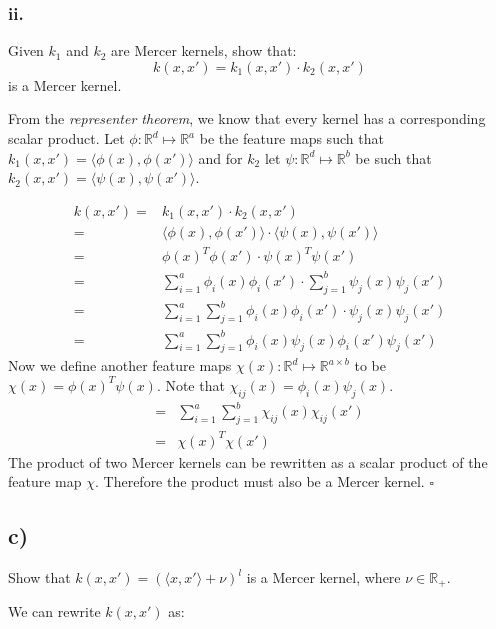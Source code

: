 \documentclass{article}
\newcommand{\R}[0]{\mathbb{R}}
\begin{document}
\subsubsection*{ii.}

Given $k_1$ and $k_2$ are Mercer kernels, show that:
\begin{equation}
    k(x, x') = k_1(x, x') \cdot k_2(x, x')
\end{equation}
is a Mercer kernel.


From the \emph{representer theorem}, we know that every kernel has a corresponding
scalar product.
Let $\phi : \R^d \mapsto \R^a $ be the feature maps such that $k_1(x, x') = \langle{}\phi(x),\phi(x')\rangle{}$ and
for $k_2$ let  $\psi : \R^d \mapsto \R^b$ be such that $k_2(x, x') = \langle{}\psi(x),\psi(x')\rangle{}$.

\begin{align}
    k(x, x') = &k_1(x, x') \cdot k_2(x, x')\\
    = & \langle{}\phi(x), \phi(x')\rangle{} \cdot \langle{}\psi(x), \psi(x')\rangle{}\\
    = & \phi(x)^T \phi(x') \cdot \psi(x)^T \psi(x')\\
    = & \sum_{i=1}^a \phi_i(x) \phi_i(x') \cdot \sum_{j=1}^b \psi_j(x) \psi_j(x')\\
    = & \sum_{i=1}^a \sum_{j=1}^b \phi_i(x) \phi_i(x') \cdot  \psi_j(x) \psi_j(x')\\
    = & \sum_{i=1}^a \sum_{j=1}^b \phi_i(x)  \psi_j(x) \phi_i(x') \psi_j(x')
\end{align}
Now we define another feature maps
$\chi(x) : \R^d \mapsto \R^{a \times b}$ to be $\chi(x) = \phi(x)^T \psi(x)$.
Note that $\chi_{ij}(x) = \phi_i(x) \psi_j(x)$.
\begin{align}
    = & \sum_{i=1}^a \sum_{j=1}^b \chi_{ij}(x)  \chi_{ij}(x') \\
    = & \chi(x)^T  \chi(x')
\end{align}
The product of two Mercer kernels can be rewritten as a scalar product of
the feature map $\chi$. Therefore the product must also be a Mercer kernel.
\hfill $\square$

\subsection*{c)}

Show that $ k(x, x') = (\langle{}x, x'\rangle{} + \nu)^l$ is a Mercer kernel, where $\nu \in \R_+$.

We can rewrite $k(x, x')$ as:
\end{document}
